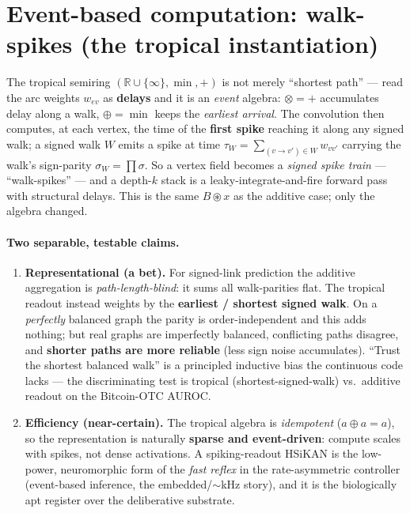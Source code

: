 \documentclass[11pt]{article}
\begin{document}
\section{Event-based computation: walk-spikes (the tropical instantiation)}\label{sec:spike}
The tropical semiring $(\mathbb{R}\cup\{\infty\},\min,+)$ is not merely ``shortest path'' --- read the arc weights
$w_{ev}$ as \textbf{delays} and it is an \emph{event} algebra: $\otimes=+$ accumulates delay along a walk,
$\oplus=\min$ keeps the \emph{earliest arrival}. The convolution then computes, at each vertex, the time of the
\textbf{first spike} reaching it along any signed walk; a signed walk $W$ emits a spike at time
$\tau_W=\sum_{(v\to v')\in W} w_{v v'}$ carrying the walk's sign-parity $\sigma_W=\prod \sigma$. So a vertex field
becomes a \emph{signed spike train} --- ``walk-spikes'' --- and a depth-$k$ stack is a leaky-integrate-and-fire
forward pass with structural delays. This is the same $B\circledast x$ as the additive case; only the algebra
changed.

\paragraph{Two separable, testable claims.}
\begin{enumerate}[nosep,leftmargin=1.4em]
  \item \textbf{Representational (a bet).} For signed-link prediction the additive aggregation is
        \emph{path-length-blind}: it sums all walk-parities flat. The tropical readout instead weights by the
        \textbf{earliest / shortest signed walk}. On a \emph{perfectly} balanced graph the parity is
        order-independent and this adds nothing; but real graphs are imperfectly balanced, conflicting paths
        disagree, and \textbf{shorter paths are more reliable} (less sign noise accumulates). ``Trust the shortest
        balanced walk'' is a principled inductive bias the continuous code lacks --- the discriminating test is
        tropical (shortest-signed-walk) vs.\ additive readout on the Bitcoin-OTC AUROC.
  \item \textbf{Efficiency (near-certain).} The tropical algebra is \emph{idempotent} ($a\oplus a=a$), so the
        representation is naturally \textbf{sparse and event-driven}: compute scales with spikes, not dense
        activations. A spiking-readout HSiKAN is the low-power, neuromorphic form of the \emph{fast reflex} in the
        rate-asymmetric controller (event-based inference, the embedded/$\sim$kHz story), and it is the
        biologically apt register over the deliberative substrate.
\end{enumerate}
\end{document}
